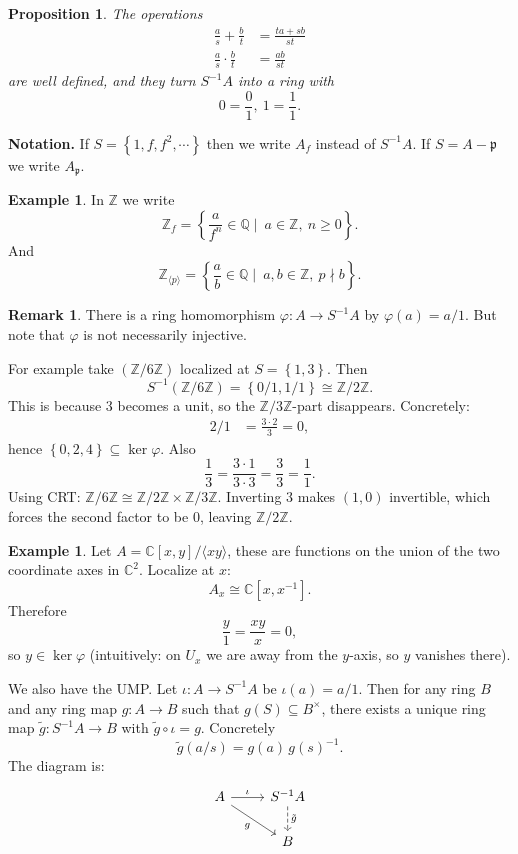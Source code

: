 \documentclass[11pt,a4paper]{article}
\theoremstyle{definition}
\newtheorem{example}[definition]{Example}
\newtheorem{remark}[definition]{Remark}
\theoremstyle{plain}
\newtheorem{proposition}[definition]{Proposition}
\theoremstyle{remark}
\newcommand{\Z}{\mathbb{Z}}
\newcommand{\Q}{\mathbb{Q}}
\newcommand{\C}{\mathbb{C}}
\renewcommand{\set}[1]{\left\{ #1 \right\}}
\newcommand{\angles}[1]{\langle #1 \rangle}
\begin{document}
\begin{proposition}
    The operations 
    \begin{align*}
        \frac{a}{s} + \frac{b}{t} &= \frac{ta + sb}{st} \\
        \frac{a}{s} \cdot \frac{b}{t} &= \frac{ab}{st}
    \end{align*}    
    are well defined, and they turn $S^{-1}A$ into a ring with 
    $$0 = \frac{0}{1}, \ 1 = \frac{1}{1}.$$
\end{proposition}

\textbf{Notation.}
If $S = \set{1,f,f^2, \cdots}$ then we write $A_f$ instead of $S^{-1}A$.
If $S = A - \mathfrak{p}$ we write $A_{\mathfrak{p}}$.

\begin{example}
    In $\Z$ we write 
    $$\Z_f = \set{\frac{a}{f^n} \in \Q \mid \ a \in \Z, \ n \ge 0}.$$
    And 
    $$\Z_{\angles{p}} = \set{\frac{a}{b} \in \Q \mid \ a,b \in \Z,\ p \nmid b}.$$
\end{example}

\begin{remark}
    There is a ring homomorphism $\varphi \colon A \to S^{-1} A$ by $\varphi(a) = a/1$. But note that $\varphi$ is not necessarily injective.

    For example take $(\Z / 6 \Z)$ localized at $S = \set{1,3}$. Then 
    $$S^{-1}(\Z / 6 \Z) = \set{0/1, 1/1} \cong \Z / 2 \Z.$$
    This is because $3$ becomes a unit, so the $\Z/3\Z$-part disappears. Concretely:
    \begin{align*}
        2/1 &= \frac{3 \cdot 2}{3} = 0,
    \end{align*}
    hence $\set{0,2,4} \subseteq \ker \varphi$. Also
    $$\frac{1}{3} = \frac{3 \cdot 1}{3\cdot 3} = \frac{3}{3} = \frac{1}{1}.$$
    Using CRT: $\Z/6\Z \cong \Z/2\Z \times \Z/3\Z$. Inverting $3$ makes $(1,0)$ invertible, which forces the second factor to be $0$, leaving $\Z/2\Z$.
\end{remark}

\begin{example}
    Let $A=\C[x,y]/\angles{xy}$, these are functions on the union of the two coordinate axes in $\C^2$. Localize at $x$:
    $$A_x \cong \C[x,x^{-1}].$$
    Therefore 
    $$\frac{y}{1} = \frac{xy}{x} = 0,$$
    so $y \in \ker \varphi$ (intuitively: on $U_x$ we are away from the $y$-axis, so $y$ vanishes there).
\end{example}

We also have the UMP. Let $\iota:A\to S^{-1}A$ be $\iota(a)=a/1$. Then for any ring $B$ and any ring map $g:A\to B$ such that $g(S)\subseteq B^\times$, there exists a unique ring map $\tilde g:S^{-1}A\to B$ with $\tilde g\circ \iota=g$. Concretely
$$\tilde g(a/s)=g(a)\,g(s)^{-1}.$$
The diagram is:
\[
\begin{tikzcd}
A \arrow[r,"\iota"] \arrow[dr,"g"'] & S^{-1}A \arrow[d,dashed,"\tilde g"] \\
& B
\end{tikzcd}
\]
\end{document}
